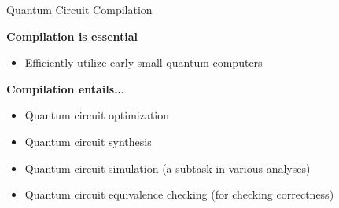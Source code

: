 \begin{frame}{Quantum Circuit Compilation}


	\begin{block}{\bf Compilation is essential}
		\begin{itemize}
		\item Efficiently utilize early small quantum computers
		\end{itemize}
	\end{block}

\pause
\vspace{-.5em}

	\begin{block}{\bf Compilation entails...}
		\begin{itemize}%
		\item<+-> Quantum circuit optimization
		\item<+-> Quantum circuit synthesis
		\item<+-> {\color{OliveGreen} Quantum circuit simulation}			\hfill (a subtask in various analyses)
		\item<+-> {\color{red} Quantum circuit equivalence checking}  \hfill (for checking correctness)%
		\end{itemize}
	\end{block}

\vspace{-.8em}


\end{frame}
